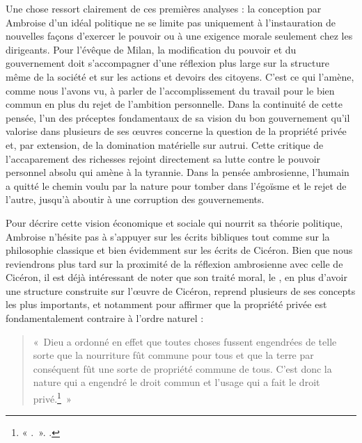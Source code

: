 Une chose ressort clairement de ces premières analyses : la conception par Ambroise d'un idéal politique ne se limite pas uniquement à l'instauration de nouvelles façons d'exercer le pouvoir ou à une exigence morale seulement chez les dirigeants. Pour l'évêque de Milan, la modification du pouvoir et du gouvernement doit s'accompagner d'une réflexion plus large sur la structure même de la société et sur les actions et devoirs des citoyens. C'est ce qui l'amène, comme nous l'avons vu, à parler de l'accomplissement du travail pour le bien commun en plus du rejet de l'ambition personnelle. Dans la continuité de cette pensée, l'un des préceptes fondamentaux de sa vision du bon gouvernement qu'il valorise dans plusieurs de ses œuvres concerne la question de la propriété privée et, par extension, de la domination matérielle sur autrui. Cette critique de l'accaparement des richesses rejoint directement sa lutte contre le pouvoir personnel absolu qui amène à la tyrannie. Dans la pensée ambrosienne, l'humain a quitté le chemin voulu par la nature pour tomber dans l'égoïsme et le rejet de l'autre, jusqu'à aboutir à une corruption des gouvernements.

\bigskip

Pour décrire cette vision économique et sociale qui nourrit sa théorie politique, Ambroise n'hésite pas à s'appuyer sur les écrits bibliques tout comme sur la philosophie classique et bien évidemment sur les écrits de Cicéron. Bien que nous reviendrons plus tard sur la proximité de la réflexion ambrosienne avec celle de Cicéron, il est déjà intéressant de noter que son traité moral, le , en plus d'avoir une structure construite sur l'œuvre de Cicéron, reprend plusieurs de ses concepts les plus importants, et notamment pour affirmer que la propriété privée est fondamentalement contraire à l'ordre naturel :

\bigskip

\begin{quote}
    «~Dieu a ordonné en effet que toutes choses fussent engendrées de telle sorte que la nourriture fût commune pour tous et que la terre par conséquent fût une sorte de propriété commune de tous. C’est donc la nature qui a engendré le droit commun et l’usage qui a fait le droit privé.\footnote{« .~». \cite[\nopp I, 132]{ambroise_devoirs_1}.}~»
\end{quote}

